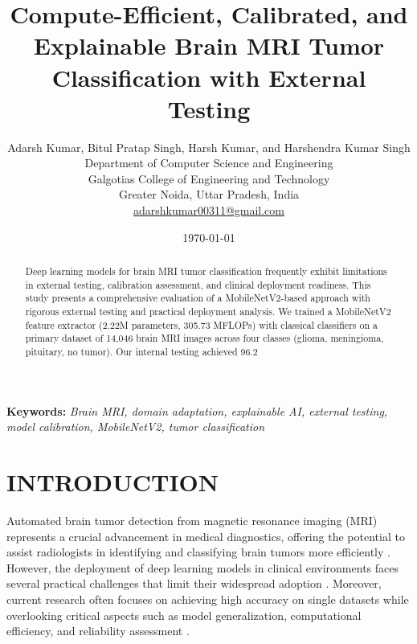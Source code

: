 \documentclass[conference]{IEEEtran}
\title{Compute-Efficient, Calibrated, and Explainable Brain MRI Tumor Classification with External Testing}
\author{Adarsh Kumar, Bitul Pratap Singh, Harsh Kumar, and Harshendra Kumar Singh \\
Department of Computer Science and Engineering \\
Galgotias College of Engineering and Technology \\
Greater Noida, Uttar Pradesh, India \\
\href{mailto:adarshkumar00311@gmail.com}{adarshkumar00311@gmail.com}}
\date{\today}
\begin{document}
\maketitle

\begin{abstract}
Deep learning models for brain MRI tumor classification frequently exhibit limitations in external testing, calibration assessment, and clinical deployment readiness. This study presents a comprehensive evaluation of a MobileNetV2-based approach with rigorous external testing and practical deployment analysis. We trained a MobileNetV2 feature extractor (2.22M parameters, 305.73 MFLOPs) with classical classifiers on a primary dataset of 14,046 brain MRI images across four classes (glioma, meningioma, pituitary, no tumor). Our internal testing achieved 96.2%
\end{abstract}

\textbf{Keywords:} \textit{Brain MRI, domain adaptation, explainable AI, external testing, model calibration, MobileNetV2, tumor classification}

\section{INTRODUCTION}

Automated brain tumor detection from magnetic resonance imaging (MRI) represents a crucial advancement in medical diagnostics, offering the potential to assist radiologists in identifying and classifying brain tumors more efficiently \cite{litjens2017}. However, the deployment of deep learning models in clinical environments faces several practical challenges that limit their widespread adoption \cite{topol2019}. Moreover, current research often focuses on achieving high accuracy on single datasets while overlooking critical aspects such as model generalization, computational efficiency, and reliability assessment \cite{challen2019}.
\end{document}
